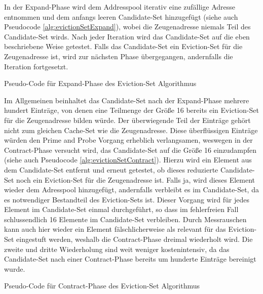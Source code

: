 In der Expand-Phase wird dem Addresspool iterativ eine zufällige Adresse entnommen und dem anfangs leeren Candidate-Set hinzugefügt (siehe auch Pseudocode \ref{alg:evictionSetExpand}), wobei die Zeugenadresse niemals Teil des Candidate-Set wirds.
Nach jeder Iteration wird das Candidate-Set auf die eben beschriebene Weise getestet.
Falls das Candidate-Set ein Eviction-Set für die Zeugenadresse ist, wird zur nächsten Phase übergegangen, andernfalls die Iteration fortgesetzt.

\begin{algorithm}[h]
\DontPrintSemicolon
\caption{Pseudo-Code für Expand-Phase des Eviction-Set Algorithmus}
\label{alg:evictionSetExpand}

\end{algorithm}

Im Allgemeinen beinhaltet das Candidate-Set nach der Expand-Phase mehrere hundert Einträge, von denen eine Teilmenge der Größe 16 bereits ein Eviction-Set für die Zeugenadresse bilden würde. 
Der überwiegende Teil der Einträge gehört nicht zum gleichen Cache-Set wie die Zeugenadresse.
Diese überflüssigen Einträge würden den Prime and Probe Vorgang erheblich verlangsamen, weswegen in der Contract-Phase versucht wird, das Candidate-Set auf die Größe 16 einzudampfen (siehe auch Pseudocode \ref{alg:evictionSetContract}).
Hierzu wird ein Element aus dem Candidate-Set entfernt und erneut getestet, ob dieses reduzierte Candidate-Set noch ein Eviction-Set für die Zeugenadresse ist.
Falls ja, wird dieses Element wieder dem Adresspool hinzugefügt, andernfalls verbleibt es im Candidate-Set, da es  notwendiger Bestandteil des Eviction-Sets ist.
Dieser Vorgang wird für jedes Element im Candidate-Set einmal durchgeführt, so dass im fehlerfreien Fall schlussendlich 16 Elemente im Candidate-Set verbleiben.
Durch Messrauschen kann auch hier wieder ein Element fälschlicherweise als relevant für das Eviction-Set eingestuft werden, weshalb die Contract-Phase dreimal wiederholt wird.
Die zweite und dritte Wiederholung sind weit weniger kostenintensiv, da das Candidate-Set nach einer Contract-Phase bereits um hunderte Einträge bereinigt wurde.

\begin{algorithm}[h]
\DontPrintSemicolon
\caption{Pseudo-Code für Contract-Phase des Eviction-Set Algorithmus}
\label{alg:evictionSetContract}
\end{algorithm}

